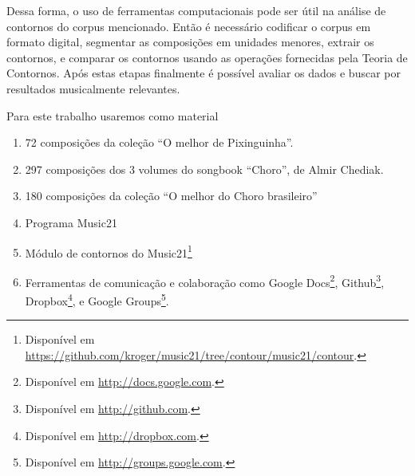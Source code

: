 \documentclass[11pt]{article}
\begin{document}
Dessa forma, o uso de ferramentas computacionais pode ser útil na
análise de contornos do corpus mencionado. Então é necessário
codificar o corpus em formato digital, segmentar as composições em
unidades menores, extrair os contornos, e comparar os contornos usando
as operações fornecidas pela Teoria de Contornos. Após estas etapas
finalmente é possível avaliar os dados e buscar por resultados
musicalmente relevantes.

Para este trabalho usaremos como material

\begin{enumerate}
\item 72 composições da coleção ``O melhor de Pixinguinha''.
\item 297 composições dos 3 volumes do songbook ``Choro'', de Almir
  Chediak.
\item 180 composições da coleção ``O melhor do Choro brasileiro''
\item Programa Music21
\item Módulo de contornos do Music21\footnote{Disponível em
    \url{https://github.com/kroger/music21/tree/contour/music21/contour}.}
\item Ferramentas de comunicação e colaboração como Google
  Docs\footnote{Disponível em \url{http://docs.google.com}.},
  Github\footnote{Disponível em \url{http://github.com}.},
  Dropbox\footnote{Disponível em \url{http://dropbox.com}.}, e Google
  Groups\footnote{Disponível em \url{http://groups.google.com}.}.
\end{enumerate}
\end{document}
